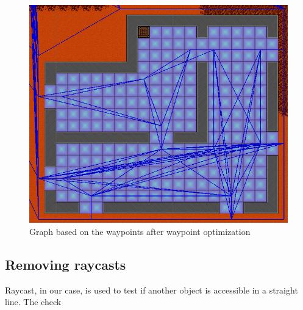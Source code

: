 \begin{figure}[H]
	\includegraphics[width=\textwidth]{figures/astar/optimizedWaypointsGraph}
	\caption{Graph based on the waypoints after waypoint optimization}
	\label{waypointgraphOpt}
\end{figure}

\subsection*{Removing raycasts}
Raycast, in our case, is used to test if another object is accessible in a straight line.
The check 